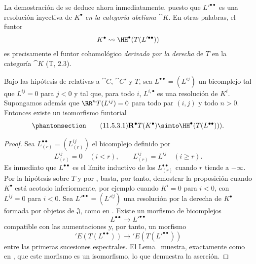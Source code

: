 \documentclass[oneside]{amsart}
\renewcommand{\geq}{\geqslant}
\let\EGAOriginalLabel\label
\renewcommand{\label}[1]{\phantomsection\EGAOriginalLabel{#1}}
\begin{document}
\begin{env}[11.5.2.5]
\label{0.11.5.2.5}
La demostración de  se deduce ahora inmediatamente, puesto que $L'^{\bullet\bullet}$ es una resolución inyectiva de $K^\bullet$ \emph{en la categoría abeliana $\cat{K}$}.
En otras palabras, el funtor
\[
  K^\bullet\leadsto\HH^\bullet(T(L'^{\bullet\bullet}))
\]
es precisamente el funtor cohomológico \emph{derivado por la derecha} de $T$ en la categoría $\cat{K}$ (T, 2.3).
\end{env}

\begin{proposition}[11.5.3]
\label{0.11.5.3}
Bajo las hipótesis de  relativas a $\cat{C}$, $\cat{C}'$ y $T$, sea $L^{\bullet\bullet}=(L^{ij})$ un bicomplejo tal que $L^{ij}=0$ para $j<0$ y tal que, para todo $i$, $L^{i,\bullet}$ es una resolución de $K^i$.
Supongamos además que $\RR^nT(L^{ij})=0$ para todo par $(i,j)$ y todo $n>0$.
Entonces existe un isomorfismo funtorial
\[
\label{0.11.5.3.1}
\tag{11.5.3.1}
  \mathbf{R}^\bullet T(K^\bullet)
  \simto
  \HH^\bullet(T(L^{\bullet\bullet}))).
\]
\end{proposition}

\begin{proof}
Sea $L^{\bullet\bullet}_{(r)}=(L^{ij}_{(r)})$ el bicomplejo definido por
\[
  L^{ij}_{(r)}=0\quad(i<r),\qquad
  L^{ij}_{(r)}=L^{ij}\quad(i\geq r).
\]
Es inmediato que $L^{\bullet\bullet}$ es el límite inductivo de los $L^{\bullet\bullet}_{(r)}$ cuando $r$ tiende a $-\infty$.
Por la hipótesis sobre $T$ y por , basta, por tanto, demostrar la proposición cuando $K^\bullet$ está acotado inferiormente, por ejemplo cuando $K^i=0$ para $i<0$, con $L^{ij}=0$ para $i<0$.
Sea $L'^{\bullet\bullet}=(L'^{ij})$ una resolución por la derecha de $K^\bullet$ formada por objetos de $\mathfrak{J}$, como en .
Existe un morfismo de bicomplejos
\[
  L^{\bullet\bullet}\longrightarrow L'^{\bullet\bullet}
\]
compatible con las aumentaciones y, por tanto, un morfismo
\[
  'E(T(L^{\bullet\bullet}))\longrightarrow{}'E(T(L'^{\bullet\bullet}))
\]
entre las primeras sucesiones espectrales.
El Lema~ muestra, exactamente como en , que este morfismo es un isomorfismo, lo que demuestra la aserción.
\end{proof}
\end{document}
